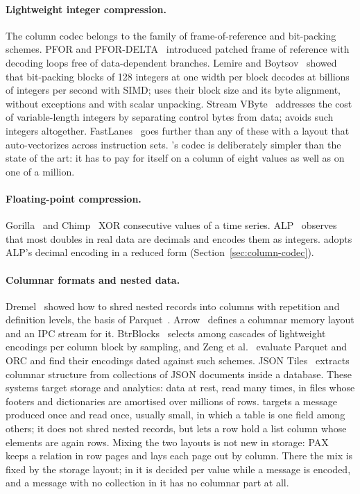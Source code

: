 \paragraph{Lightweight integer compression.} The column codec belongs to the
family of frame-of-reference and bit-packing schemes. PFOR and
PFOR-DELTA~\cite{zukowski2006pfor} introduced patched frame of reference with
decoding loops free of data-dependent branches. Lemire and
Boytsov~\cite{lemire2015simdbp128} showed that bit-packing blocks of 128
integers at one width per block decodes at billions of integers per second
with SIMD; \colbin{} uses their block size and its byte alignment, without
exceptions and with scalar unpacking. Stream
VByte~\cite{lemire2018streamvbyte} addresses the cost of variable-length
integers by separating control bytes from data; \colbin{} avoids such
integers altogether. FastLanes~\cite{afroozeh2023fastlanes} goes further than
any of these with a layout that auto-vectorizes across instruction sets.
\colbin{}'s codec is deliberately simpler than the state of the art: it has to
pay for itself on a column of eight values as well as on one of a million.

\paragraph{Floating-point compression.} Gorilla~\cite{pelkonen2015gorilla}
and Chimp~\cite{liakos2022chimp} XOR consecutive values of a time series.
ALP~\cite{afroozeh2023alp} observes that most doubles in real data are
decimals and encodes them as integers. \colbin{} adopts ALP's decimal
encoding in a reduced form (Section~\ref{sec:column-codec}).

\paragraph{Columnar formats and nested data.} Dremel~\cite{melnik2010dremel}
showed how to shred nested records into columns with repetition and definition
levels, the basis of Parquet~\cite{parquet}. Arrow~\cite{arrow} defines a
columnar memory layout and an IPC stream for it. BtrBlocks~\cite{kuschewski2023btrblocks}
selects among cascades of lightweight encodings per column block by sampling,
and Zeng et al.~\cite{zeng2023columnar} evaluate Parquet and ORC and find
their encodings dated against such schemes. JSON
Tiles~\cite{durner2021jsontiles} extracts columnar structure from collections
of JSON documents inside a database. These systems target storage and
analytics: data at rest, read many times, in files whose footers and
dictionaries are amortised over millions of rows. \colbin{} targets a message
produced once and read once, usually small, in which a table is one field
among others; it does not shred nested records, but lets a row hold a list
column whose elements are again rows. Mixing the two layouts is not new in
storage: PAX~\cite{ailamaki2001pax} keeps a relation in row pages and lays
each page out by column. There the mix is fixed by the storage layout; in
\colbin{} it is decided per value while a message is encoded, and a message
with no collection in it has no columnar part at all.

